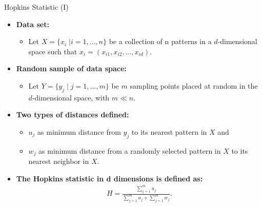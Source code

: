 \begin{frame}{Hopkins Statistic (I)}
	\begin{itemize}
		\item \textbf{Data set:}
		      \begin{itemize}
			      \item Let $X = \{x_i \; \vert i=1,\ldots,n\}$ be a collection of n
			            patterns in a $d$-dimensional space such that $x_i = (x_{i1},
				            x_{i2}, \ldots, x_{id})$.
		      \end{itemize}
		\item \textbf{Random sample of data space:}
		      \begin{itemize}
			      \item Let $Y = \{y_j \; \vert \; j=1, \ldots, m\}$ be $m$ sampling
			            points placed at random in the $d$-dimensional space, with $m \ll
				            n$.
		      \end{itemize}
		\item \textbf{Two types of distances defined:}
		      \begin{itemize}
			      \item $u_j$ as minimum distance from $y_j$ to its nearest pattern
			            in $X$ and
			      \item $w_j$ as minimum distance from a randomly selected pattern in
			            $X$ to its nearest neighbor in $X$.
		      \end{itemize}
		\item \textbf{The {\color{airforceblue}Hopkins} statistic in d
			      dimensions is defined as:}
		      \begin{align}
			      H = \frac{\sum_{j=1}^{m} u_j}{\sum_{j=1}^{m}u_j + \sum_{j=1}^{m}
				      w_j}.
		      \end{align}
	\end{itemize}
\end{frame}

